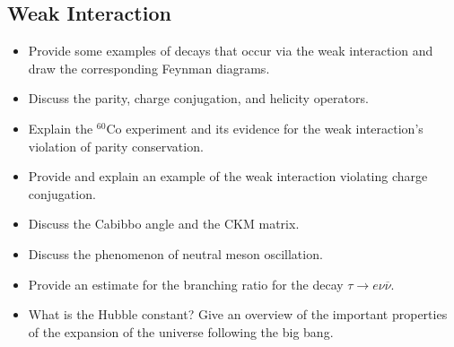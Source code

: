 \subsection{Weak Interaction}
\begin{itemize}
	\item Provide some examples of decays that occur via the weak interaction and draw the corresponding Feynman diagrams.
	
	\item Discuss the parity, charge conjugation, and helicity operators. 
	
	\item Explain the ${}^{60}\mathrm{Co}$ experiment and its evidence for the weak interaction's violation of parity conservation.
	
	\item Provide and explain an example of the weak interaction violating charge conjugation.
	
	\item Discuss the Cabibbo angle and the CKM matrix.
	
	\item Discuss the phenomenon of neutral meson oscillation.
	
	\item Provide an estimate for the branching ratio for the decay $\tau \to e\nu \overline{\nu}$.
	
	\item What is the Hubble constant?
    Give an overview of the important properties of the expansion of the universe following the big bang.
\end{itemize}














